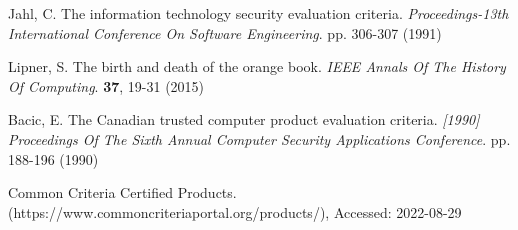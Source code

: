 Jahl, C. The information technology security evaluation criteria. {\em Proceedings-13th International Conference On Software Engineering}. pp. 306-307 (1991)

Lipner, S. The birth and death of the orange book. {\em IEEE Annals Of The History Of Computing}. \textbf{37}, 19-31 (2015)

Bacic, E. The Canadian trusted computer product evaluation criteria. {\em [1990] Proceedings Of The Sixth Annual Computer Security Applications Conference}. pp. 188-196 (1990)

Common Criteria Certified Products. (https://www.commoncriteriaportal.org/products/), Accessed: 2022-08-29